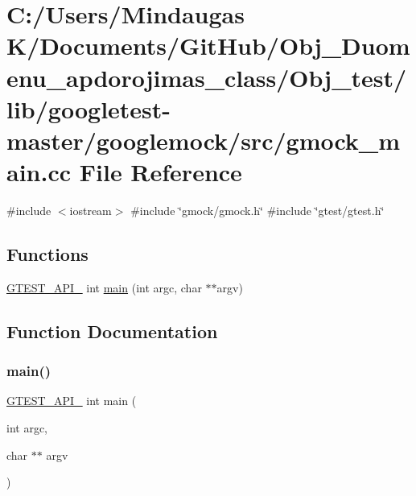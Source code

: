 \hypertarget{_obj__test_2lib_2googletest-master_2googlemock_2src_2gmock__main_8cc}{}\section{C\+:/\+Users/\+Mindaugas K/\+Documents/\+Git\+Hub/\+Obj\+\_\+\+Duomenu\+\_\+apdorojimas\+\_\+class/\+Obj\+\_\+test/lib/googletest-\/master/googlemock/src/gmock\+\_\+main.cc File Reference}
\label{_obj__test_2lib_2googletest-master_2googlemock_2src_2gmock__main_8cc}
{\ttfamily \#include $<$iostream$>$}\newline
{\ttfamily \#include \char`\"{}gmock/gmock.\+h\char`\"{}}\newline
{\ttfamily \#include \char`\"{}gtest/gtest.\+h\char`\"{}}\newline
\subsection*{Functions}
\begin{DoxyCompactItemize}
\item 
\mbox{\hyperlink{_obj__test_2lib_2googletest-release-1_88_81_2googletest_2include_2gtest_2internal_2gtest-port_8h_aa73be6f0ba4a7456180a94904ce17790}{G\+T\+E\+S\+T\+\_\+\+A\+P\+I\+\_\+}} int \mbox{\hyperlink{_obj__test_2lib_2googletest-master_2googlemock_2src_2gmock__main_8cc_a7f83bdc516d2cb86e20235d94ddf055a}{main}} (int argc, char $\ast$$\ast$argv)
\end{DoxyCompactItemize}


\subsection{Function Documentation}
\mbox{\label{_obj__test_2lib_2googletest-master_2googlemock_2src_2gmock__main_8cc_a7f83bdc516d2cb86e20235d94ddf055a}} 
\subsubsection{\texorpdfstring{main()}{main()}}
{\footnotesize\ttfamily \mbox{\hyperlink{_obj__test_2lib_2googletest-release-1_88_81_2googletest_2include_2gtest_2internal_2gtest-port_8h_aa73be6f0ba4a7456180a94904ce17790}{G\+T\+E\+S\+T\+\_\+\+A\+P\+I\+\_\+}} int main (\begin{DoxyParamCaption}\item[{int}]{argc,  }\item[{char $\ast$$\ast$}]{argv }\end{DoxyParamCaption})}

